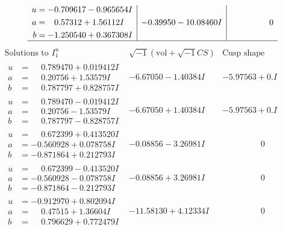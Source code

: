 \documentclass[1p]{elsarticle_modified}
\theoremstyle{definition}
\newcommand{\I}{\sqrt{-1}}
\begin{document}
$$\begin{array}{c|c|c}
\begin{aligned}
u &= -0.709617 - 0.965654 I \\
a &= \phantom{-}0.57312 + 1.56112 I \\
b &= -1.250540 + 0.367308 I\end{aligned}
 & -0.39950 - 10.08460 I & \phantom{-0.000000 } 0\\
 \hline 
 \end{array}$$\newpage$$\begin{array}{c|c|c}  
\text{Solutions to }I^u_{1}& \I (\text{vol} + \sqrt{-1}CS) & \text{Cusp shape}\\
 \hline 
\begin{aligned}
u &= \phantom{-}0.789470 + 0.019412 I \\
a &= \phantom{-}0.20756 + 1.53579 I \\
b &= \phantom{-}0.787797 + 0.828757 I\end{aligned}
 & -6.67050 - 1.40384 I & -5.97563 + 0. I\phantom{ +0.000000I} \\ \hline\begin{aligned}
u &= \phantom{-}0.789470 - 0.019412 I \\
a &= \phantom{-}0.20756 - 1.53579 I \\
b &= \phantom{-}0.787797 - 0.828757 I\end{aligned}
 & -6.67050 + 1.40384 I & -5.97563 + 0. I\phantom{ +0.000000I} \\ \hline\begin{aligned}
u &= \phantom{-}0.672399 + 0.413520 I \\
a &= -0.560928 + 0.078758 I \\
b &= -0.871864 + 0.212793 I\end{aligned}
 & -0.08856 - 3.26981 I & \phantom{-0.000000 } 0 \\ \hline\begin{aligned}
u &= \phantom{-}0.672399 - 0.413520 I \\
a &= -0.560928 - 0.078758 I \\
b &= -0.871864 - 0.212793 I\end{aligned}
 & -0.08856 + 3.26981 I & \phantom{-0.000000 } 0 \\ \hline\begin{aligned}
u &= -0.912970 + 0.802094 I \\
a &= \phantom{-}0.47515 + 1.36604 I \\
b &= \phantom{-}0.796629 + 0.772479 I\end{aligned}
 & -11.58130 + 4.12334 I & \phantom{-0.000000 } 0 \\ \hline\begin{aligned}

\end{aligned}
\end{array}$$
\end{document}
